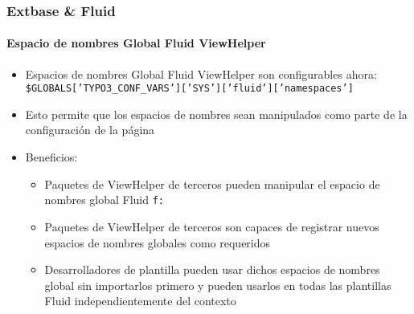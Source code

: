 \begin{frame}[fragile]
	\frametitle{Extbase \& Fluid}
	\framesubtitle{Espacio de nombres Global Fluid ViewHelper}

	\begin{itemize}
		\item Espacios de nombres Global Fluid ViewHelper son configurables ahora:\newline
			\smaller
				\texttt{\$GLOBALS['TYPO3\_CONF\_VARS']['SYS']['fluid']['namespaces']}
			\normalsize
		\item Esto permite que los espacios de nombres sean manipulados como parte de la configuración de la página
		\item Beneficios:

			\begin{itemize}
				\item Paquetes de ViewHelper de terceros pueden manipular el espacio de nombres global Fluid \texttt{f:}
				\item Paquetes de ViewHelper de terceros son capaces de registrar nuevos espacios de nombres globales como requeridos
				\item Desarrolladores de plantilla pueden usar dichos espacios de nombres global sin importarlos primero
					y pueden usarlos en todas las plantillas Fluid independientemente del contexto
			\end{itemize}

	\end{itemize}

\end{frame}


